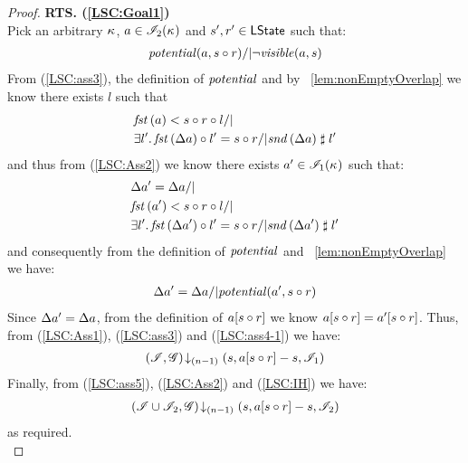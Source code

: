 \begin{lemma}
\begin{proof}
\noindent\textbf{RTS. (\ref{LSC:Goal1})} \\
Pick an arbitrary $\kappa_{}$, $a \in \mathscr{I}_2(\kappa_{})$ and $s', r' \in \textsf{LState}$ such that:
\begin{align}
	\mathit{potential}(a, s \circ r) /| \neg\mathit{visible}(a, s) \label{LSC:ass3}
\end{align}
From (\ref{LSC:ass3}), the definition of $\mathit{potential}$ and by \lem~\ref{lem:nonEmptyOverlap} we know there exists $l$ such that 
%
\begin{align*}
	& \fst{a} < s \composeL r \composeL l /| \null\\
	& \exsts{l'} \fst{\updateFP{a}} \composeL l' = s \composeL r /| \snd{\updateFP{a}} \compatible l'
\end{align*}
%
and thus from (\ref{LSC:Ass2}) we know there exists $a' \in \mathscr{I}_1(\kappa_{})$ such that: 
%
\begin{align*}
	& \updateFP{a'} = \updateFP{a} /|\\
	& \fst{a'} < s \composeL r \composeL l /| \null\\
	& \exsts{l'} \fst{\updateFP{a'}} \composeL l' = s \composeL r /| \snd{\updateFP{a'}} \compatible l'
\end{align*}
%
and consequently from the definition of $\mathit{potential}$ and \lem~\ref{lem:nonEmptyOverlap} we have: 
%
\begin{align}
	\Delta {a'} = \Delta {a} /| \mathit{potential}(a', s \circ r) \label{LSC:ass4-1}
\end{align}
Since $\Delta {a'} = \Delta {a}$, from the definition of $a[s \circ r]$ we know $a[s \circ r] = a'[s \circ r]$. Thus, from (\ref{LSC:Ass1}), (\ref{LSC:ass3}) and (\ref{LSC:ass4-1}) we have:
%
\begin{align}
	\left(\mathscr{I}, \mathscr{G}\right) \!\downarrow_{(n-1)} \left(s, a[s \circ r] - s, \mathscr{I}_1\right) \label{LSC:ass5}
\end{align}
%
Finally, from (\ref{LSC:ass5}), (\ref{LSC:Ass2}) and (\ref{LSC:IH}) we have:
%
\begin{align*}
	\left(\mathscr{I} \cup \mathscr{I}_2, \mathscr{G}\right) \!\downarrow_{(n-1)} \left(s, a[s \circ r] - s, \mathscr{I}_2\right)
\end{align*}
%
as required.\\
%
%
%


\end{proof}
\end{lemma}
